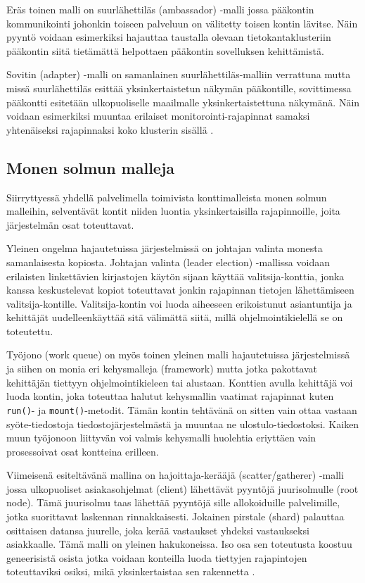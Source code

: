 \documentclass[finnish,gradu]{tktltiki3}
\begin{document}
Eräs toinen malli on suurlähettiläs (ambassador) -malli jossa pääkontin kommunikointi johonkin toiseen palveluun on välitetty toisen kontin lävitse. Näin pyyntö voidaan esimerkiksi hajauttaa taustalla olevaan tietokantaklusteriin pääkontin siitä tietämättä helpottaen pääkontin sovelluksen kehittämistä.

Sovitin (adapter) -malli on samanlainen suurlähettiläs-malliin verrattuna mutta missä suurlähettiläs esittää yksinkertaistetun näkymän pääkontille, sovittimessa pääkontti esitetään ulkopuoliselle maailmalle yksinkertaistettuna näkymänä. Näin voidaan esimerkiksi muuntaa erilaiset monitorointi-rajapinnat samaksi yhtenäiseksi rajapinnaksi koko klusterin sisällä \cite{container-design-patterns}.

\subsection{Monen solmun malleja}

Siirryttyessä yhdellä palvelimella toimivista konttimalleista monen solmun malleihin, selventävät kontit niiden luontia yksinkertaisilla rajapinnoille, joita järjestelmän osat toteuttavat.

Yleinen ongelma hajautetuissa järjestelmissä on johtajan valinta monesta samanlaisesta kopiosta. Johtajan valinta (leader election) -mallissa voidaan erilaisten linkettävien kirjastojen käytön sijaan käyttää valitsija-konttia, jonka kanssa keskustelevat kopiot toteuttavat jonkin rajapinnan tietojen lähettämiseen valitsija-kontille. Valitsija-kontin voi luoda aiheeseen erikoistunut asiantuntija ja kehittäjät uudelleenkäyttää sitä välimättä siitä, millä ohjelmointikielellä se on toteutettu.

Työjono (work queue) on myös toinen yleinen malli hajautetuissa järjestelmissä ja siihen on monia eri kehysmalleja (framework) mutta jotka pakottavat kehittäjän tiettyyn ohjelmointikieleen tai alustaan. Konttien avulla kehittäjä voi luoda kontin, joka toteuttaa halutut kehysmallin vaatimat rajapinnat kuten \texttt{run()}- ja \texttt{mount()}-metodit. Tämän kontin tehtävänä on sitten vain ottaa vastaan syöte-tiedostoja tiedostojärjestelmästä ja muuntaa ne ulostulo-tiedostoksi. Kaiken muun työjonoon liittyvän voi valmis kehysmalli huolehtia eriyttäen vain prosessoivat osat kontteina erilleen.

Viimeisenä esiteltävänä mallina on hajoittaja-kerääjä (scatter/gatherer) -malli jossa ulkopuoliset asiakasohjelmat (client) lähettävät pyyntöjä juurisolmulle (root node). Tämä juurisolmu taas lähettää pyyntöjä sille allokoiduille palvelimille, jotka suorittavat laskennan rinnakkaisesti. Jokainen pirstale (shard) palauttaa osittaisen datansa juurelle, joka kerää vastaukset yhdeksi vastaukseksi asiakkaalle. Tämä malli on yleinen hakukoneissa. Iso osa sen toteutusta koostuu geneerisistä osista jotka voidaan konteilla luoda tiettyjen rajapintojen toteuttaviksi osiksi, mikä yksinkertaistaa sen rakennetta \cite{container-design-patterns}.
\end{document}
